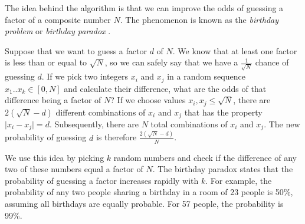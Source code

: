 \documentclass[paper=a4, fontsize=11pt,numbers=endperiod]{scrartcl} %
\providecommand{\abs}[1]{\lvert#1\rvert} %
\numberwithin{equation}{section} %
\numberwithin{figure}{section} %
\numberwithin{table}{section} %
\begin{document}
The idea behind the algorithm is that we can improve the odds of guessing a factor of a composite number $N$.
The phenomenon is known as the \emph{birthday problem} or \emph{birthday paradox} \cite{birthday}.


Suppose that we want to guess a factor $d$ of $N$.
We know that at least one factor is less than or equal to $\sqrt{N}$, so we can safely say that we have a $\frac{1}{\sqrt{N}}$ chance of guessing $d$.
If we pick two integers $x_i$ and $x_j$ in a random sequence ${x_1 .. x_k} \in [0,N]$ and calculate their difference, what are the odds of that difference being a factor of $N$?
If we choose values $x_i, x_j \leq \sqrt{N}$, there are $2(\sqrt{N}-d)$ different combinations of $x_i$ and $x_j$ that has the property $\abs{x_i - x_j} = d$. %
Subsequently, there are $N$ total combinations of $x_i$ and $x_j$.
The new probability of guessing $d$ is therefore $\frac{2(\sqrt{N}-d)}{N}$. \cite{colorado}

We use this idea by picking $k$ random numbers and check if the difference of any two of these numbers equal a factor of $N$.
The birthday paradox states that the probability of guessing a factor increases rapidly with $k$.
For example, the probability of any two people sharing a birthday in a room of 23 people is 50\%, assuming all birthdays are equally probable.
For 57 people, the probability is 99\%.
\end{document}
